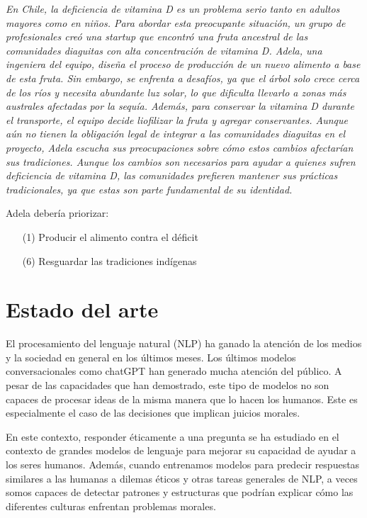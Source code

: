 \documentclass[
	spanish, %
	letterpaper, oneside
]{article}
\begin{document}
\newp \textit{En Chile, la deficiencia de vitamina D es un problema serio tanto en adultos mayores como en niños. Para abordar esta preocupante situación, un grupo de profesionales creó una startup que encontró una fruta ancestral de las comunidades diaguitas con alta concentración de vitamina D. Adela, una ingeniera del equipo, diseña el proceso de producción de un nuevo alimento a base de esta fruta. Sin embargo, se enfrenta a desafíos, ya que el árbol solo crece cerca de los ríos y necesita abundante luz solar, lo que dificulta llevarlo a zonas más australes afectadas por la sequía. Además, para conservar la vitamina D durante el transporte, el equipo decide liofilizar la fruta y agregar conservantes. Aunque aún no tienen la obligación legal de integrar a las comunidades diaguitas en el proyecto, Adela escucha sus preocupaciones sobre cómo estos cambios afectarían sus tradiciones. Aunque los cambios son necesarios para ayudar a quienes sufren deficiencia de vitamina D, las comunidades prefieren mantener sus prácticas tradicionales, ya que estas son parte fundamental de su identidad.}

Adela debería priorizar:
\begin{itemize}
    \item[(1)] Producir el alimento contra el déficit
    \item[(6)] Resguardar las tradiciones indígenas
\end{itemize}


\section{Estado del arte}

El procesamiento del lenguaje natural (NLP) ha ganado la atención de los medios y la sociedad en general en los últimos meses. Los últimos modelos conversacionales como chatGPT han generado mucha atención del público. A pesar de las capacidades que han demostrado, este tipo de modelos no son capaces de procesar ideas de la misma manera que lo hacen los humanos. Este es especialmente el caso de las decisiones que implican juicios morales.

\newp En este contexto, responder éticamente a una pregunta se ha estudiado en el contexto de grandes modelos de lenguaje para mejorar su capacidad de ayudar a los seres humanos. Además, cuando entrenamos modelos para predecir respuestas similares a las humanas a dilemas éticos y otras tareas generales de NLP, a veces somos capaces de detectar patrones y estructuras que podrían explicar cómo las diferentes culturas enfrentan problemas morales.
\end{document}
